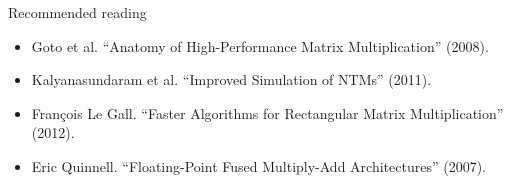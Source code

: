 \documentclass[mathserif,xcolor={dvipsnames,table}]{beamer}
\begin{document}
%

\begin{frame}{Recommended reading}
\tiny{
\begin{itemize}
\item Goto et al. ``Anatomy of High-Performance Matrix Multiplication'' (2008).
\item Kalyanasundaram et al. ``Improved Simulation of NTMs'' (2011).
\item Fran\c{c}ois Le Gall. ``Faster Algorithms for Rectangular Matrix Multiplication'' (2012).
\item Eric Quinnell. ``Floating-Point Fused Multiply-Add Architectures'' (2007).
\end{itemize}
}
\end{frame}

\end{document}
